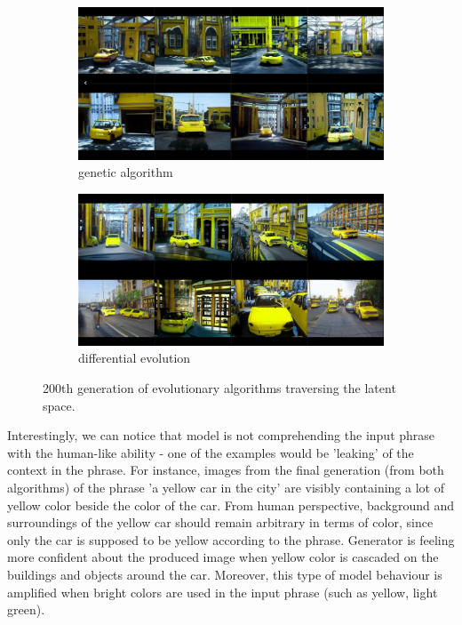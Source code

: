 \documentclass[12pt,a4paper,openany]{book}
\begin{document}
\begin{figure}[H]
\centering
\begin{subfigure}[b]{1.0\textwidth}
   \includegraphics[width=1\linewidth]{GA_yellowcar_200.PNG}
   \caption{genetic algorithm}
   \label{fig:Ng1} 
\end{subfigure}

\begin{subfigure}[b]{1.0\textwidth}
   \includegraphics[width=1\linewidth]{DE_yellowcar_200.PNG}
   \caption{differential evolution}
   \label{fig:Ng2}
\end{subfigure}

\caption[Two numerical solutions]{200th generation of evolutionary algorithms traversing the latent space.}
\end{figure}

\noindent Interestingly, we can notice that model is not comprehending the input phrase with the human-like ability - one of the examples would be 'leaking' of the context in the phrase. For instance, images from the final generation (from both algorithms) of the phrase 'a yellow car in the city' are visibly containing a lot of yellow color beside the color of the car. From human perspective, background and surroundings of the yellow car should remain arbitrary in terms of color, since only the car is supposed to be yellow according to the phrase. Generator is feeling more confident about the produced image when yellow color is cascaded on the buildings and objects around the car. Moreover, this type of model behaviour is amplified when bright colors are used in the input phrase (such as yellow, light green).
\end{document}
